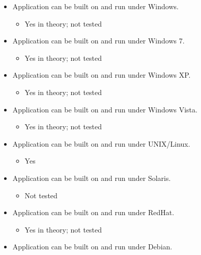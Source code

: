 \begin{itemize}
\itemsep1pt\parskip0pt
\item
  Application can be built on and run under Windows.

  \begin{itemize}
  \itemsep1pt\parskip0pt
  \item
    Yes in theory; not tested
  \end{itemize}
\item
  Application can be built on and run under Windows 7.

  \begin{itemize}
  \itemsep1pt\parskip0pt
  \item
    Yes in theory; not tested
  \end{itemize}
\item
  Application can be built on and run under Windows XP.

  \begin{itemize}
  \itemsep1pt\parskip0pt
  \item
    Yes in theory; not tested
  \end{itemize}
\item
  Application can be built on and run under Windows Vista.

  \begin{itemize}
  \itemsep1pt\parskip0pt
  \item
    Yes in theory; not tested
  \end{itemize}
\item
  Application can be built on and run under UNIX/Linux.

  \begin{itemize}
  \itemsep1pt\parskip0pt
  \item
    Yes
  \end{itemize}
\item
  Application can be built on and run under Solaris.

  \begin{itemize}
  \itemsep1pt\parskip0pt
  \item
    Not tested
  \end{itemize}
\item
  Application can be built on and run under RedHat.

  \begin{itemize}
  \itemsep1pt\parskip0pt
  \item
    Yes in theory; not tested
  \end{itemize}
\item
  Application can be built on and run under Debian.


\end{itemize}
